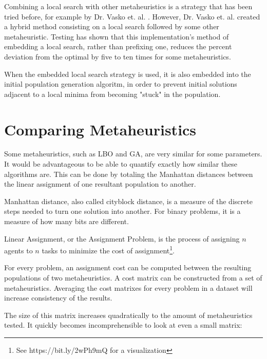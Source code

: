 \documentclass[11pt, letterpaper, onecolumn]{article}
\begin{document}
Combining a local search with other metaheuristics is a strategy that has been tried before, for example by Dr. Vasko et. al. \cite{mmkp}. However, Dr. Vasko et. al. created a hybrid method consisting on a local search followed by some other metaheuristic. Testing has shown that this implementation's method of embedding a local search, rather than prefixing one, reduces the percent deviation from the optimal by five to ten times for some metaheuristics.

When the embedded local search strategy is used, it is also embedded into the initial population generation algoritm, in order to prevent initial solutions adjacent to a local minima from becoming "stuck" in the population. 

\section{Comparing Metaheuristics} \label{compare}

Some metaheuristics, such as LBO and GA, are very similar for some parameters. It would be advantageous to be able to quantify exactly how similar these algorithms are. This can be done by totaling the Manhattan distances between the linear assignment of one resultant population to another. 

Manhattan distance, also called cityblock distance, is a measure of the discrete steps needed to turn one solution into another. For binary problems, it is a measure of how many bits are different. 

Linear Assignment, or the Assignment Problem, is the process of assigning $n$ agents to $n$ tasks to minimize the cost of assignment\footnote{See https://bit.ly/2wPh9mQ for a visualization}. 

For every problem, an assignment cost can be computed between the resulting populations of two metaheuristics. A cost matrix can be constructed from a set of metaheuristics. Averaging the cost matrixes for every problem in a dataset will increase consistency of the results. 

The size of this matrix increases quadratically to the amount of metaheuristics tested. It quickly becomes incomprehensible to look at even a small matrix:	

\begin{table}[htbp]
\end{table}
\end{document}
